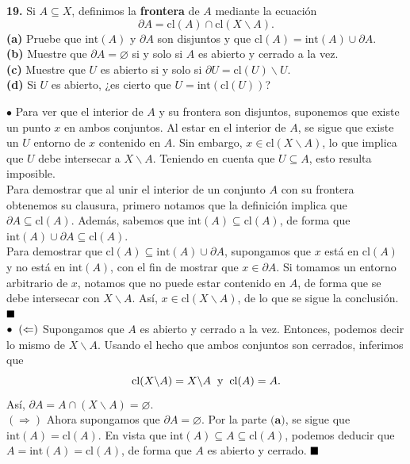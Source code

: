 \documentclass{article}
\begin{document}
\begin{mybox}
	\textbf{19. } Si $A \subseteq X$, definimos la \textbf{frontera} de $A$ mediante la ecuación
	$$ \partial A = \text{cl}(A) \cap \text{cl}(X \backslash A). $$
	\textbf{(a)} Pruebe que $\text{int}(A)$ y $\partial A$ son disjuntos y que $\text{cl}(A) = \text{int}(A) \cup \partial A$. \\
	
	\textbf{(b)} Muestre que $\partial A = \varnothing $ si y solo si $A$ es abierto y cerrado a la vez. \\
	
	\textbf{(c)} Muestre que $U$ es abierto si y solo si $\partial U = \text{cl}(U) \backslash U$.\\
	
	\textbf{(d)} Si $U$ es abierto, ¿es cierto que $U = \text{int}(\text{cl}(U))$?
\end{mybox}	
$\bullet$ Para ver que el interior de $A$ y su frontera son disjuntos, suponemos que existe un punto $x$ en ambos conjuntos. Al estar en el interior de $A$, se sigue que existe un $U$ entorno de $x$ contenido en $A$. Sin embargo, $x \in \text{cl}(X \backslash A)$, lo que implica que $U$ debe intersecar a $X \backslash A$. Teniendo en cuenta que $U \subseteq A$, esto resulta imposible. \\

Para demostrar que al unir el interior de un conjunto $A$ con su frontera obtenemos su clausura, primero notamos que la definición implica que $\partial A \subseteq \text{cl}(A)$. Además, sabemos que $\text{int}(A) \subseteq \text{cl}(A)$, de forma que $\text{int}(A) \cup \partial A \subseteq \text{cl}(A)$.\\
Para demostrar que $\text{cl}(A) \subseteq \text{int}(A) \cup \partial A$, supongamos que $x$ está en $\text{cl}(A)$ y no está en $\text{int}(A)$, con el fin de mostrar que $x \in \partial A$. Si tomamos un entorno arbitrario de $x$, notamos que no puede estar contenido en $A$, de forma que se debe intersecar con $X \backslash A$. Así, $x \in \text{cl}(X \backslash A)$, de lo que se sigue la conclusión. $\hspace*{\fill} \blacksquare$ \\

$\bullet \hspace{0.2cm} (\Leftarrow)$ Supongamos que $A$ es abierto y cerrado a la vez. Entonces, podemos decir lo mismo de $X \backslash A$. Usando el hecho que ambos conjuntos son cerrados, inferimos que 
$$ \text{cl}(X \backslash A) = X \backslash A \hspace{0.2cm} \text{y} \hspace{0.2cm} \text{cl}(A) = A.$$
Así, $ \partial A = A \cap (X \backslash A) = \varnothing.$   \\
$(\Rightarrow)$ Ahora supongamos que $\partial A = \varnothing.$ Por la parte $\textbf{(a)}$, se sigue que $\text{int} (A) = \text{cl}(A)$. En vista que $\text{int}(A) \subseteq A \subseteq \text{cl}(A)$, podemos deducir que $A = \text{int}(A) = \text{cl}(A)$, de forma que $A$ es abierto y cerrado. $\hspace*{\fill} \blacksquare$ \\
\end{document}
